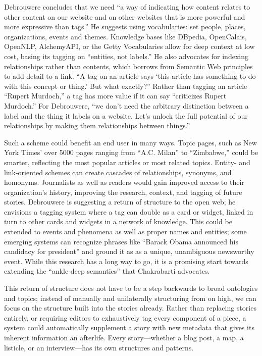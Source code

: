 Debrouwere concludes that we need ``a way of indicating how content relates to other content on our website and on other websites that is more powerful and more expressive than tags.'' He suggests using vocabularies: set people, places, organizations, events and themes. Knowledge bases like DBpedia, OpenCalais, OpenNLP, AlchemyAPI, or the Getty Vocabularies allow for deep context at low cost, basing its tagging on ``entities, not labels.'' He also advocates for indexing relationships rather than contents, which borrows from Semantic Web principles to add detail to a link. ``A tag on an article says `this article has something to do with this concept or thing.' But what exactly?'' Rather than tagging an article ``Rupert Murdoch,'' a tag has more value if it can say ``criticizes Rupert Murdoch.'' For Debrouwere, ``we don't need the arbitrary distinction between a label and the thing it labels on a website. Let's unlock the full potential of our relationships by making them relationships between things.''

Such a scheme could benefit an end user in many ways. Topic pages, such as New York Times' over 5000 pages ranging from ``A.C. Milan'' to ``Zimbabwe,'' could be smarter, reflecting the most popular articles or most related topics. Entity- and link-oriented schemes can create cascades of relationships, synonyms, and homonyms. Journalists as well as readers would gain improved access to their organization's history, improving the research, context, and tagging of future stories. Debrouwere is suggesting a return of structure to the open web; he envisions a tagging system where a tag can double as a card or widget, linked in turn to other cards and widgets in a network of knowledge. This could be extended to events and phenomena as well as proper names and entities; some emerging systems can recognize phrases like ``Barack Obama announced his candidacy for president'' and ground it as as a unique, unambiguous newsworthy event.\autocite{nothman_grounding_2013} While this research has a long way to go, it is a promising start towards extending the ``ankle-deep semantics'' that Chakrabarti advocates.\autocite[289]{chakrabarti_mining_2003}

This return of structure does not have to be a step backwards to broad ontologies and topics; instead of manually and unilaterally structuring from on high, we can focus on the structure built into the stories already. Rather than replacing stories entirely, or requiring editors to exhaustively tag every component of a piece, a system could automatically supplement a story with new metadata that gives its inherent information an afterlife. Every story---whether a blog post, a map, a listicle, or an interview---has its own structures and patterns.

